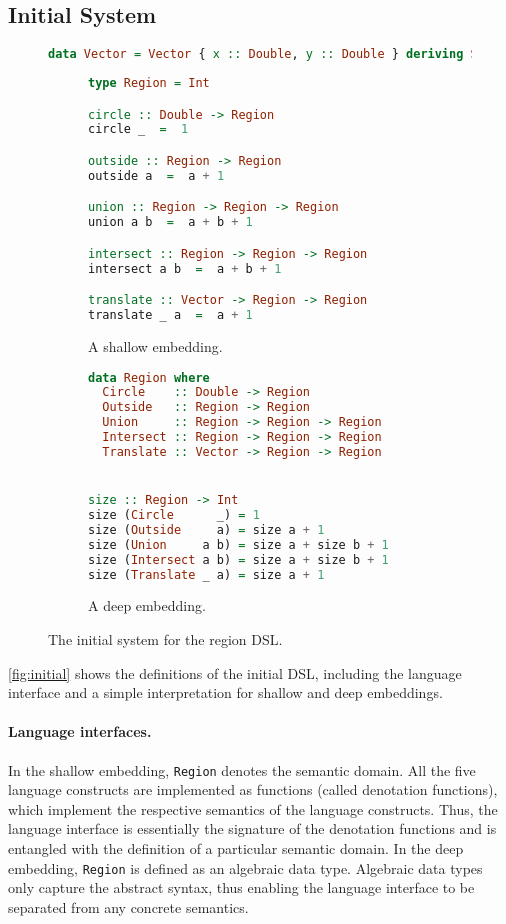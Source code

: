 \subsection{Initial System}

\begin{figure}
\begin{lstlisting}[language=Haskell,basicstyle=\ttfamily\footnotesize]
data Vector = Vector { x :: Double, y :: Double } deriving Show
\end{lstlisting}
\begin{subfigure}[b]{.5\textwidth}
\begin{lstlisting}[language=Haskell,deletekeywords={union,intersect},basicstyle=\ttfamily\footnotesize]
type Region = Int

circle :: Double -> Region
circle _  =  1

outside :: Region -> Region
outside a  =  a + 1

union :: Region -> Region -> Region
union a b  =  a + b + 1

intersect :: Region -> Region -> Region
intersect a b  =  a + b + 1

translate :: Vector -> Region -> Region
translate _ a  =  a + 1
\end{lstlisting}
\caption{A shallow embedding.}
\end{subfigure}%
\begin{subfigure}[b]{.5\textwidth}
\begin{lstlisting}[language=Haskell,basicstyle=\ttfamily\footnotesize]
data Region where
  Circle    :: Double -> Region
  Outside   :: Region -> Region
  Union     :: Region -> Region -> Region
  Intersect :: Region -> Region -> Region
  Translate :: Vector -> Region -> Region


size :: Region -> Int
size (Circle      _) = 1
size (Outside     a) = size a + 1
size (Union     a b) = size a + size b + 1
size (Intersect a b) = size a + size b + 1
size (Translate _ a) = size a + 1
\end{lstlisting}
\caption{A deep embedding.} \label{fig:pattern}
\end{subfigure}
\caption{The initial system for the region DSL.} \label{fig:initial}
\end{figure}

\noindent
\autoref{fig:initial} shows the definitions of the initial DSL, including the
language interface and a simple interpretation for shallow and deep embeddings.

\paragraph{Language interfaces.}
In the shallow embedding, \lstinline{Region} denotes the semantic domain. All
the five language constructs are implemented as functions (called denotation
functions), which implement the respective semantics of the language constructs.
Thus, the language interface is essentially the signature of the denotation
functions and is entangled with the definition of a particular semantic domain.
In the deep embedding, \lstinline{Region} is defined as an algebraic data type.
Algebraic data types only capture the abstract syntax, thus enabling the
language interface to be separated from any concrete semantics.

